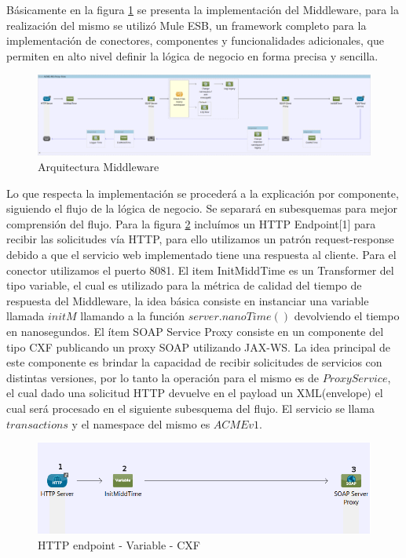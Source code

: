 \documentclass[12pt]{article}
\begin{document}
Básicamente en la figura \ref{fig:diagrama} se presenta la implementación del Middleware, para la realización del mismo se utilizó Mule ESB, un framework completo para la implementación de conectores, componentes y funcionalidades adicionales, que permiten en alto nivel definir la lógica de negocio en forma precisa y sencilla.

\begin{landscape}
  \begin{figure}[!h]
  \centering
    \includegraphics[scale=0.27]{../acmeesb/ACME-WS-Proxy-Flow.png}
  \caption{Arquitectura Middleware}
  \label{fig:diagrama}
\end{figure} 
\end{landscape}


Lo que respecta la implementación se procederá a la explicación por componente, siguiendo el flujo de la lógica de negocio. Se separará en subesquemas para mejor comprensión del flujo.
Para la figura \ref{fig:g1} incluímos un HTTP Endpoint[1] para recibir las solicitudes vía HTTP, para ello utilizamos un patrón request-response debido a que el servicio web implementado tiene una respuesta al cliente. Para el conector utilizamos el puerto 8081.
El item InitMiddTime es un Transformer del tipo variable, el cual es utilizado para la métrica de calidad del tiempo de respuesta del Middleware, la idea básica consiste en instanciar una variable llamada $initM$ llamando a la función $server.nanoTime()$ devolviendo el tiempo en nanosegundos.
El ítem SOAP Service Proxy consiste en un componente del tipo CXF publicando un proxy SOAP utilizando JAX-WS. La 
idea principal de este componente es brindar la capacidad de recibir solicitudes de servicios con distintas versiones, por lo tanto la operación para el mismo es de $Proxy Service$, el cual dado una solicitud HTTP devuelve en el payload un XML(envelope) el cual será procesado en el siguiente subesquema del flujo. El servicio se llama $transactions$ y el namespace del mismo es $ACMEv1$.

  \begin{figure}[!h]
  \centering
    \includegraphics[scale=0.5]{./images/g1.png}
  \caption{HTTP endpoint - Variable - CXF}
  \label{fig:g1}
\end{figure} 
\end{document}
